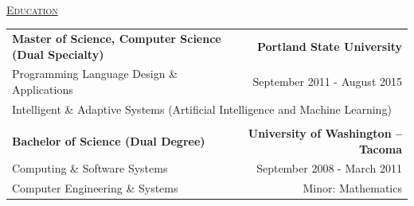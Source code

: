 \documentclass[letterpaper]{article}
\begin{document}
\begin{center}
\begin{tabular}{p{}p{}r}
		\end{tabular} \\
		\vspace{0.25in} %
		\underline{\large \scshape Education}
		\begin{tabular}{p{}r}
				\textbf{Master of Science, Computer Science (Dual Specialty)}							&
				\textbf{Portland State University \quad}
			\\
				\quad Programming Language Design \& Applications\quad				&
				{September 2011 - August 2015 \quad\quad}
			\\	
				\multicolumn{2}{p{\textwidth}}{\quad Intelligent \& Adaptive Systems (Artificial Intelligence and Machine Learning)}
				
			\\
			\\
				\textbf{Bachelor of Science (Dual Degree)}			&
				\textbf{University of Washington -- Tacoma \quad}
			\\
				{\quad Computing \& Software Systems}						&
				{September 2008 - March 2011 \quad\quad}
			\\
				{\quad Computer Engineering \& Systems}						&
				{Minor: Mathematics \quad\quad}
				

\end{tabular}
\end{center}
\end{document}
